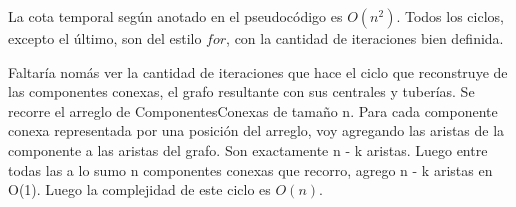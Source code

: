 \documentclass[11pt, a4paper, twoside]{article}
\begin{document}
{}
La cota temporal según anotado en el pseudocódigo es $O(n^2)$. Todos los ciclos, excepto el último, son del estilo $for$, con la cantidad de iteraciones bien definida.

Faltaría nomás ver la cantidad de iteraciones que hace el ciclo que reconstruye de las componentes conexas, el grafo resultante con sus centrales y tuberías. Se recorre el arreglo de ComponentesConexas de tamaño n. Para cada componente conexa representada por una posición del arreglo, voy agregando las aristas de la componente a las aristas del grafo. Son exactamente n - k aristas. Luego entre todas las a lo sumo n componentes conexas que recorro, agrego n - k aristas en O(1). Luego la complejidad de este ciclo es $O(n)$.
\end{document}
